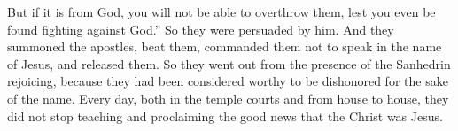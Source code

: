 \begin{biblechapter}
\verse But if it is from God, you will not be able to overthrow them, lest you even be found fighting against God.” So they were persuaded by him.
\verse And they summoned the apostles, beat them, commanded them not to speak in the name of Jesus, and released them.
\verse So they went out from the presence of the Sanhedrin rejoicing, because they had been considered worthy to be dishonored for the sake of the name.
\verse Every day, both in the temple courts and from house to house, they did not stop teaching and proclaiming the good news that the Christ was Jesus.
\end{biblechapter}

